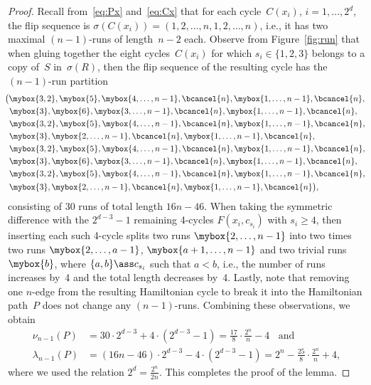 \begin{proof}
Recall from~\eqref{eq:Px} and~\eqref{eq:Cx} that for each cycle~$C(x_i)$, $i=1,\ldots,2^d$, the flip sequence is $\sigma(C(x_i))=(1,2,\ldots,n,1,2,\ldots,n)$, i.e., it has two maximal $(n-1)$-runs of length~$n-2$ each.
Observe from Figure~\ref{fig:run} that when gluing together the eight cycles~$C(x_i)$ for which $s_i\in\{1,2,3\}$ belongs to a copy of~$S$ in~$\sigma(R)$, then the flip sequence of the resulting cycle has the $(n-1)$-run partition
\begin{alignat*}{8}
   & \!\!\!\big(\mybox{3,2},\mybox{5},\mybox{4,\dots,n-1},\bcancel{n},\mybox{1,\dots,n-1},\bcancel{n}, \\
   & \mybox{3},\mybox{6},\mybox{3,\dots,n-1},\bcancel{n},\mybox{1,\dots,n-1},\bcancel{n}, \\
   & \mybox{3,2},\mybox{5},\mybox{4,\dots,n-1},\bcancel{n},\mybox{1,\dots,n-1},\bcancel{n}, \\
   & \mybox{3},\mybox{2,\dots,n-1},\bcancel{n},\mybox{1,\dots,n-1},\bcancel{n},\\
   & \mybox{3,2},\mybox{5},\mybox{4,\dots,n-1},\bcancel{n},\mybox{1,\dots,n-1},\bcancel{n}, \\
   & \mybox{3},\mybox{6},\mybox{3,\dots,n-1},\bcancel{n},\mybox{1,\dots,n-1},\bcancel{n},\\
   & \mybox{3,2},\mybox{5},\mybox{4,\dots,n-1},\bcancel{n},\mybox{1,\dots,n-1},\bcancel{n},\\
   & \mybox{3},\mybox{2,\dots,n-1},\bcancel{n},\mybox{1,\dots,n-1},\bcancel{n}\big),
\end{alignat*}
consisting of 30 runs of total length $16n-46$.
%
When taking the symmetric difference with the $2^{d-3}-1$ remaining 4-cycles $F(x_i,c_{s_i})$ with $s_i\geq 4$, then inserting each such 4-cycle splits two runs $\mybox{2,\dots,n-1}$ into two times two runs $\mybox{2,\dots,a-1}$, $\mybox{a+1,\dots,n-1}$ and two trivial runs $\mybox{b}$, where $\{a,b\}\ass c_{s_i}$ such that $a<b$, i.e., the number of runs increases by~4 and the total length decreases by~4.
%
Lastly, note that removing one $n$-edge from the resulting Hamiltonian cycle to break it into the Hamiltonian path~$P$ does not change any $(n-1)$-runs.
%
Combining these observations, we obtain
\begin{equation*}
\begin{split}
\nu_{n-1}(P) &= 30\cdot 2^{d-3}+4\cdot(2^{d-3}-1)=\frac{17}{8}\cdot\frac{2^n}{n}-4 \;\;\text{ and } \\
\lambda_{n-1}(P) &= (16n-46)\cdot2^{d-3}-4\cdot(2^{d-3}-1)=2^n-\frac{25}{8}\cdot \frac{2^n}{n}+4,
\end{split}
\end{equation*}
where we used the relation $2^d=\frac{2^n}{2n}$.
This completes the proof of the lemma.
\end{proof}
